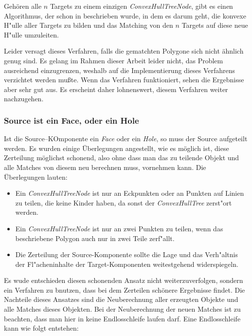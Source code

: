Gehören alle $n$ Targets zu einem einzigen \textit{ConvexHullTreeNode}, gibt es einen Algorithmus, der schon in \cite{TG} beschrieben wurde, in dem es darum geht, die konvexe H"ulle aller Targets zu bilden und das Matching von den $n$ Targets auf diese neue H"ulle umzuleiten.

Leider versagt dieses Verfahren, falls die gematchten Polygone sich nicht ähnlich genug sind. Es gelang im Rahmen dieser Arbeit leider nicht, das Problem ausreichend einzugrenzen, weshalb auf die Implementierung dieses Verfahrens verzichtet werden mußte. Wenn das Verfahren funktioniert, sehen die Ergebnisse aber sehr gut aus. Es erscheint daher lohnenswert, diesem Verfahren weiter nachzugehen.

\subsubsection*{Source ist ein Face, oder ein Hole}

Ist die Source--KOmponente ein \textit{Face} oder ein \textit{Hole},  so muss der Source aufgeteilt werden. Es wurden einige Überlegungen angestellt, wie es möglich ist, diese Zerteilung möglichst schonend, also ohne dass man das zu teilende Objekt und alle Matches von diesem neu berechnen muss, vornehmen kann. Die Überlegungen lauten:
\begin{itemize}
\item Ein \textit{ConvexHullTreeNode} ist nur an Eckpunkten oder an Punkten auf Linien zu teilen, die keine Kinder haben, da sonst der \textit{ConvexHullTree} zerst"ort werden.

\item Ein \textit{ConvexHullTreeNode} ist nur an zwei Punkten zu teilen, wenn das beschriebene Polygon auch nur in zwei Teile zerf"allt.

\item Die Zerteilung der Source-Komponente sollte die Lage und das Verh"altnis der Fl"acheninhalte der Target-Komponenten weitestgehend widerspiegeln.

\end{itemize} 

Es wude entschieden diesen schonenden Ansatz nicht weiterzuverfolgen, sondern ein Verfahren zu bnutzen, dass bei dem Zerteilen schönere Ergebnisse findet. Die Nachteile dieses Ansatzes sind die Neuberechnung aller erzeugten Objekte und alle Matches dieses Objekten. Bei der Neuberechnung der neuen Matches ist zu beachten, dass man hier in keine Endlosschleife laufen darf. Eine Endlosschleife kann wie folgt entstehen:

